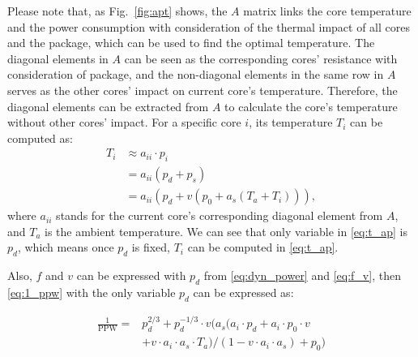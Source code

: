 Please note that, as Fig.~\ref{fig:apt} shows, the $A$ matrix links the core temperature and the power consumption with consideration of the thermal impact of all cores and the package, which can be used to find the optimal temperature. The diagonal elements in $A$ can be seen as the corresponding cores' resistance with consideration of package, and the non-diagonal elements in the same row in $A$ serves as the other cores' impact on current core's temperature. Therefore, the diagonal elements can be extracted from $A$ to calculate the core's temperature without other cores' impact. For a specific core $i$, its temperature $T_{i}$ can be computed as:
\begin{equation}\label{eq:t_ap}
\begin{split}
T_{i}&\approx a_{ii} \cdot p_{i}\\
&=a_{ii}(p_{d}+p_{s})\\
&=a_{ii}(p_{d}+v (p_{0}+a_{s}(T_{a}+T_{i}))),
\end{split}
\end{equation}
where $a_{ii}$ stands for the current core's corresponding diagonal element from $A$, and $T_{a}$ is the ambient temperature. We can see that only variable in \eqref{eq:t_ap} is $p_{d}$, which means once $p_{d}$ is fixed, $T_{i}$ can be computed in \eqref{eq:t_ap}.

Also, $f$ and $v$ can be expressed with $p_{d}$ from \eqref{eq:dyn_power} and \eqref{eq:f_v}, then \eqref{eq:1_ppw} with the only variable $p_{d}$ can be expressed as:


\begin{equation}\label{eq:1_ppw_detail}
\begin{split}
\frac{1}{\text{PPW}} = &p_{d}^{2/3}+p_{d}^{-1/3}\cdot v(a_{s}(a_{i} \cdot p_{d}+a_{i} \cdot p_{0} \cdot v\\
 &+ v \cdot a_{i} \cdot a_{s} \cdot T_{a})/(1-v \cdot a_{i} \cdot a_{s})+p_{0})
\end{split}
\end{equation}

